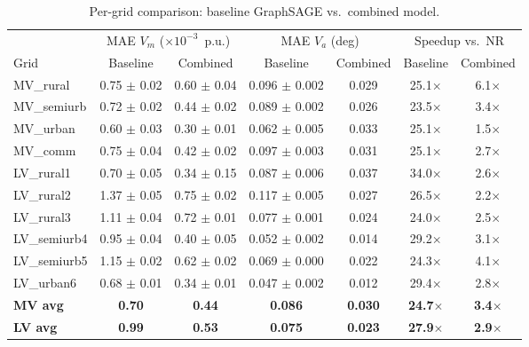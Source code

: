 \documentclass[preprint,review,12pt]{elsarticle}
\begin{document}
\begin{table}[!t]
\renewcommand{\arraystretch}{1.1}
\caption{Per-grid comparison: baseline GraphSAGE vs.\ combined model.}
\label{tab:combined}
\centering
\begin{tabular}{l cc cc cc}
\toprule
& \multicolumn{2}{c}{MAE $V_m$ ($\times 10^{-3}$~p.u.)} & \multicolumn{2}{c}{MAE $V_a$ (deg)} & \multicolumn{2}{c}{Speedup vs.\ NR} \\
\cmidrule(lr){2-3} \cmidrule(lr){4-5} \cmidrule(lr){6-7}
Grid & Baseline & Combined & Baseline & Combined & Baseline & Combined \\
\midrule
MV\_rural & 0.75 $\pm$ 0.02 & 0.60 $\pm$ 0.04 & 0.096 $\pm$ 0.002 & 0.029 & 25.1$\times$ & 6.1$\times$ \\
MV\_semiurb & 0.72 $\pm$ 0.02 & 0.44 $\pm$ 0.02 & 0.089 $\pm$ 0.002 & 0.026 & 23.5$\times$ & 3.4$\times$ \\
MV\_urban & 0.60 $\pm$ 0.03 & 0.30 $\pm$ 0.01 & 0.062 $\pm$ 0.005 & 0.033 & 25.1$\times$ & 1.5$\times$ \\
MV\_comm & 0.75 $\pm$ 0.04 & 0.42 $\pm$ 0.02 & 0.097 $\pm$ 0.003 & 0.031 & 25.1$\times$ & 2.7$\times$ \\
\midrule
LV\_rural1 & 0.70 $\pm$ 0.05 & 0.34 $\pm$ 0.15 & 0.087 $\pm$ 0.006 & 0.037 & 34.0$\times$ & 2.6$\times$ \\
LV\_rural2 & 1.37 $\pm$ 0.05 & 0.75 $\pm$ 0.02 & 0.117 $\pm$ 0.005 & 0.027 & 26.5$\times$ & 2.2$\times$ \\
LV\_rural3 & 1.11 $\pm$ 0.04 & 0.72 $\pm$ 0.01 & 0.077 $\pm$ 0.001 & 0.024 & 24.0$\times$ & 2.5$\times$ \\
LV\_semiurb4 & 0.95 $\pm$ 0.04 & 0.40 $\pm$ 0.05 & 0.052 $\pm$ 0.002 & 0.014 & 29.2$\times$ & 3.1$\times$ \\
LV\_semiurb5 & 1.15 $\pm$ 0.02 & 0.62 $\pm$ 0.02 & 0.069 $\pm$ 0.000 & 0.022 & 24.3$\times$ & 4.1$\times$ \\
LV\_urban6 & 0.68 $\pm$ 0.01 & 0.34 $\pm$ 0.01 & 0.047 $\pm$ 0.002 & 0.012 & 29.4$\times$ & 2.8$\times$ \\
\midrule
\textbf{MV avg} & \textbf{0.70} & \textbf{0.44} & \textbf{0.086} & \textbf{0.030} & \textbf{24.7$\times$} & \textbf{3.4$\times$} \\
\textbf{LV avg} & \textbf{0.99} & \textbf{0.53} & \textbf{0.075} & \textbf{0.023} & \textbf{27.9$\times$} & \textbf{2.9$\times$} \\
\bottomrule
\end{tabular}
\end{table}
\end{document}

